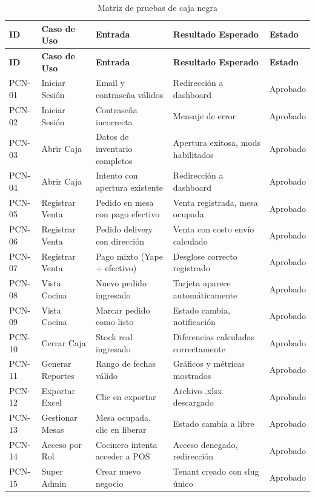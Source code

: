 \documentclass[12pt, a4paper]{article}
\begin{document}
\begin{longtable}{|l|p{3.5cm}|p{4cm}|p{3.5cm}|l|}
    \caption{Matriz de pruebas de caja negra} \\
    \hline
    \textbf{ID} & \textbf{Caso de Uso} & \textbf{Entrada} & \textbf{Resultado Esperado} & \textbf{Estado} \\ \hline
    \endfirsthead
    \hline
    \textbf{ID} & \textbf{Caso de Uso} & \textbf{Entrada} & \textbf{Resultado Esperado} & \textbf{Estado} \\ \hline
    \endhead
    \hline
    \endfoot

    PCN-01 & Iniciar Sesión & Email y contraseña válidos & Redirección a dashboard & Aprobado \\ \hline
    PCN-02 & Iniciar Sesión & Contraseña incorrecta & Mensaje de error & Aprobado \\ \hline
    PCN-03 & Abrir Caja & Datos de inventario completos & Apertura exitosa, mods habilitados & Aprobado \\ \hline
    PCN-04 & Abrir Caja & Intento con apertura existente & Redirección a dashboard & Aprobado \\ \hline
    PCN-05 & Registrar Venta & Pedido en mesa con pago efectivo & Venta registrada, mesa ocupada & Aprobado \\ \hline
    PCN-06 & Registrar Venta & Pedido delivery con dirección & Venta con costo envío calculado & Aprobado \\ \hline
    PCN-07 & Registrar Venta & Pago mixto (Yape + efectivo) & Desglose correcto registrado & Aprobado \\ \hline
    PCN-08 & Vista Cocina & Nuevo pedido ingresado & Tarjeta aparece automáticamente & Aprobado \\ \hline
    PCN-09 & Vista Cocina & Marcar pedido como listo & Estado cambia, notificación & Aprobado \\ \hline
    PCN-10 & Cerrar Caja & Stock real ingresado & Diferencias calculadas correctamente & Aprobado \\ \hline
    PCN-11 & Generar Reportes & Rango de fechas válido & Gráficos y métricas mostrados & Aprobado \\ \hline
    PCN-12 & Exportar Excel & Clic en exportar & Archivo .xlsx descargado & Aprobado \\ \hline
    PCN-13 & Gestionar Mesas & Mesa ocupada, clic en liberar & Estado cambia a libre & Aprobado \\ \hline
    PCN-14 & Acceso por Rol & Cocinero intenta acceder a POS & Acceso denegado, redirección & Aprobado \\ \hline
    PCN-15 & Super Admin & Crear nuevo negocio & Tenant creado con slug único & Aprobado \\ \hline
\end{longtable}
\end{document}
